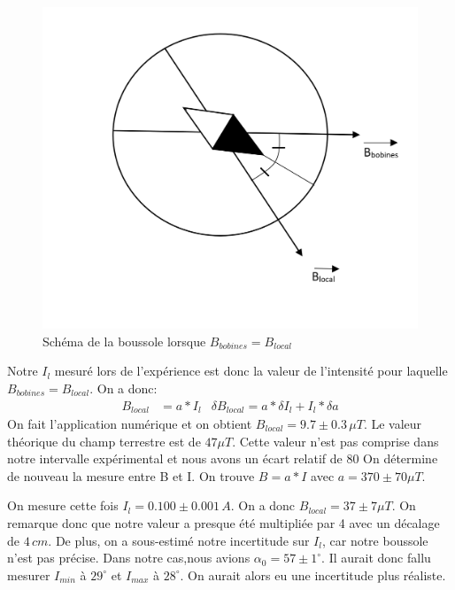 \documentclass[12pt]{article}
\begin{document}
\begin{figure}[!h]
	\begin{center}
		\includegraphics[scale=0.5]{img/Boussole.png}
	\end{center}
	\label{SchmBouss}
	\caption{Schéma de la boussole lorsque $B_{bobines}=B_{local}$}
\end{figure}

Notre $I_l$ mesuré lors de l'expérience est donc la valeur de l'intensité pour laquelle $B_{bobines}=B_{local}$. On a donc:
\begin{align*}
B_{local}&=a*I_l & \delta B_{local}=a*\delta I_l + I_l * \delta a
\end{align*}
On fait l'application numérique et on obtient $B_{local}=9.7\pm 0.3\, \mu T$. Le valeur théorique du champ terrestre est de $47\mu T$. Cette valeur n'est pas comprise dans notre intervalle expérimental et nous avons un écart relatif de 80%
On détermine de nouveau la mesure entre B et I. On trouve $B=a*I$ avec $a=370\pm 70 \mu T$. 

On mesure cette fois $I_l=0.100\pm 0.001 \, A$. On a donc $B_{local}=37\pm 7 \mu T$. On remarque donc que notre valeur a presque été multipliée par 4 avec un décalage de $4\, cm$. De plus, on a sous-estimé notre incertitude sur $I_l$, car notre boussole n'est pas précise. Dans notre cas,nous avions $\alpha_0=57\pm 1^\circ$. Il aurait donc fallu mesurer $I_{min}$ à $29^\circ$ et $I_{max}$ à $28^\circ$. On aurait alors eu une incertitude plus réaliste. 
\end{document}
